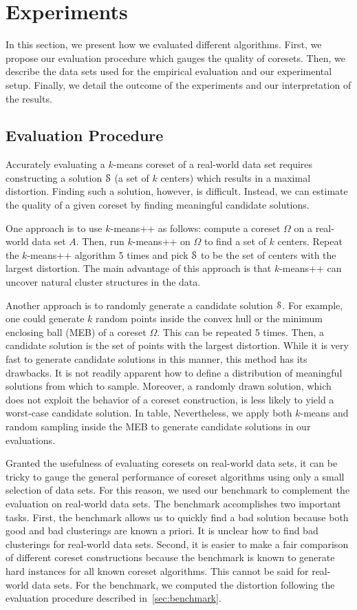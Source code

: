 


\section{Experiments} \label{sec:experiments}
In this section, we present how we evaluated different algorithms. First, we propose our evaluation procedure which gauges the quality of coresets. Then, we describe the data sets used for the empirical evaluation and our experimental setup. Finally, we detail the outcome of the experiments and our interpretation of the results.

\subsection{Evaluation Procedure}
\label{sec:evaluation-procedure}
Accurately evaluating a $k$-means coreset of a real-world data set requires constructing a solution $\mathcal{S}$ (a set of $k$ centers) which results in a maximal distortion. Finding such a solution, however, is difficult. Instead, we can estimate the quality of a given coreset by finding meaningful candidate solutions. 

One approach is to use $k$-means++ as follows: compute a coreset $\Omega$ on a real-world data set $A$. Then, run $k$-means++ on $\Omega$ to find a set of $k$ centers. Repeat the $k$-means++ algorithm 5 times and pick $\mathcal{S}$ to be the set of centers with the largest distortion. The main advantage of this approach is that $k$-means++ can uncover natural cluster structures in the data.

Another approach is to randomly generate a candidate solution $\mathcal{S}$. For example, one could generate $k$ random points inside the convex hull or the minimum enclosing ball (MEB) of a coreset $\Omega$. This can be repeated 5 times. Then, a  candidate solution is the set of points with the largest distortion. While it is very fast to generate candidate solutions in this manner, this method has its drawbacks. It is not readily apparent how to define a distribution of meaningful solutions from which to sample. Moreover, a randomly drawn solution, which does not exploit the behavior of a coreset construction, is less likely to yield a worst-case candidate solution. In table, Nevertheless, we apply both $k$-means and random sampling inside the MEB to generate candidate solutions in our evaluations.

Granted the usefulness of evaluating coresets on real-world data sets, it can be tricky to gauge the general performance of coreset algorithms using only a small selection of data sets. For this reason, we used our benchmark to complement the evaluation on real-world data sets. The benchmark accomplishes two important tasks. First, the benchmark allows us to quickly find a bad solution because both good and bad clusterings are known a priori. It is unclear how to find bad clusterings for real-world data sets. Second, it is easier to make a fair comparison of different coreset constructions because the benchmark is known to generate hard instances for all known coreset algorithms. This cannot be said for real-world data sets. For the benchmark, we computed the distortion following the evaluation procedure described in~\cref{sec:benchmark}. 


